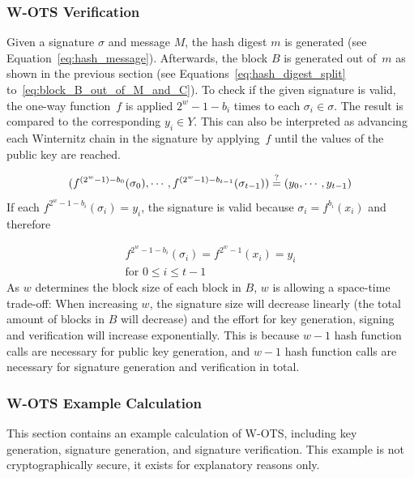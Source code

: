 \subsubsection{W-OTS Verification}
\label{sec:wots-verification}
Given a signature $\sigma$ and message $M$, the hash digest $m$ is generated (see Equation~\ref{eq:hash_message}). Afterwards, the block $B$ is generated out of~$m$ as shown in the previous section (see Equations~\ref{eq:hash_digest_split} to~\ref{eq:block_B_out_of_M_and_C}). To check if the given signature is valid, the one-way function~$f$ is applied $2^w - 1 - b_i$ times to each $\sigma_i \in \sigma$. The result is compared to the corresponding $y_i \in Y$. This can also be interpreted as advancing each Winternitz chain in the signature by applying~$f$ until the  values of the public key are reached.

\begin{equation}
\label{eq:wots_verify}
(f^{(2^w-1)-b_0}(\sigma_0), \cdots, f^{(2^w - 1) - b_{t-1}}(\sigma_{t-1})) \stackrel{?}{=} (y_0, \cdots, y_{t-1})
\end{equation}
If each $f^{2^w-1-b_i}(\sigma_i) = y_i$, the signature is valid because $\sigma_i = f^{b_i}(x_i)$ and therefore

\begin{gather}
f^{2^w-1-b_i}(\sigma_i) = f^{2^w-1}(x_i) = y_i \\
\text{for  }0 \leq i \leq t-1 \nonumber
\end{gather}
As $w$ determines the block size of each block in $B$, $w$ is allowing a space-time trade-off: When increasing $w$, the signature size will decrease linearly (the total amount of blocks in $B$ will decrease) and the effort for key generation, signing and verification will increase exponentially. This is because $w-1$ hash function calls are necessary for public key generation, and $w-1$ hash function calls are necessary for signature generation and verification in total.

\subsubsection{W-OTS Example Calculation}
\label{sec:w-ots_example_calc}
This section contains an example calculation of W-OTS, including key generation, signature generation, and signature verification. This example is not cryptographically secure, it exists for explanatory reasons only.


